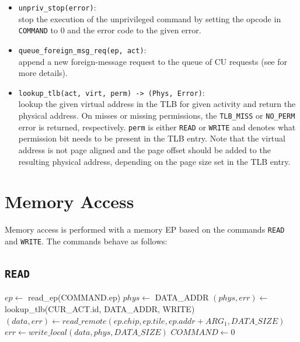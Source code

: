 \begin{itemize}
  $-1$ if none was found.
  \item \texttt{unpriv\_stop(error)}:\\
  stop the execution of the unprivileged command by setting the opcode in \texttt{COMMAND} to 0 and
  the error code to the given error.
  \item \texttt{queue\_foreign\_msg\_req(ep, act)}:\\
  append a new foreign-message request to the queue of CU requests (see
   for more details).\extend{}
  \item \texttt{lookup\_tlb(\colorbox{tilemux}{act, }virt, perm) -> (Phys, Error)}:\\
  lookup the given virtual address in the TLB \colorbox{tilemux}{for given activity} and return the
  physical address. On misses or missing permissions, the \texttt{TLB\_MISS} or \texttt{NO\_PERM}
  error is returned, respectively. \texttt{perm} is either \texttt{READ} or \texttt{WRITE} and denotes what permission bit needs to be present in the TLB entry. Note that the virtual address is not page aligned and the page
  offset should be added to the resulting physical address, depending on the page size set in the
  TLB entry.\extend{}
\end{itemize}

\section{Memory Access}

Memory access is performed with a memory EP based on the commands \texttt{READ} and \texttt{WRITE}.
The commands behave as follows:

\subsection{\texttt{READ}}

\begin{algorithm}[H]
    $ep \gets$ read\_ep(COMMAND.ep)\;
    \extend{}
    \extend{}
    \BlankLine
    $phys \gets$ DATA\_ADDR\;
    $(phys, err) \gets$ lookup\_tlb(\colorbox{tilemux}{CUR\_ACT.id, }DATA\_ADDR, WRITE)\;
    \extend{}
    \BlankLine
    $(data, err) \gets read\_remote(ep.chip, ep.tile, ep.addr + ARG_1, DATA\_SIZE)$\;
    \extend{}
    $err \gets write\_local(data, phys, DATA\_SIZE)$\;
    \extend{}
    \BlankLine
    $COMMAND \gets 0$\;
    \caption{The TCU's \texttt{READ} command.}
\end{algorithm}

